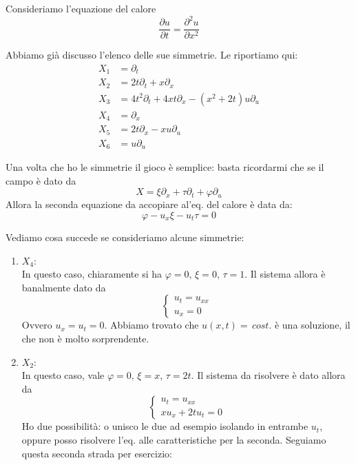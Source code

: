 \documentclass{report}
\begin{document}
\begin{example}
    Consideriamo l'equazione del calore 
    \begin{equation}
        \frac{\partial u}{\partial t} = \frac{\partial^2 u}{\partial x^2}
    \end{equation}

    Abbiamo già discusso l'elenco delle sue simmetrie. Le riportiamo qui: 
    \begin{align}
    X_1 &= \partial_t \\
    X_2 &= 2t\partial_t + x\partial_x \\
    X_3 &= 4t^2\partial_t + 4xt\partial_x - (x^2 + 2t)u\partial_u \\
    X_4 &= \partial_x \\
    X_5 &= 2t\partial_x - xu\partial_u \\
    X_6 &= u\partial_u
\end{align}

Una volta che ho le simmetrie il gioco è semplice: basta ricordarmi che se il campo è dato da 
\begin{equation}
    X = \xi\partial_x + \tau\partial_t + \varphi\partial_u
\end{equation}
Allora la seconda equazione da accopiare al'eq. del calore è data da: 
\begin{equation}
    \varphi - u_x\xi - u_t\tau = 0 
\end{equation}

Vediamo cosa succede se consideriamo alcune simmetrie: 
\begin{enumerate}
    \item $X_4$: \\
    In questo caso, chiaramente si ha $\varphi=0, \, \xi = 0, \, \tau = 1$. Il sistema allora è banalmente dato da 
    \[\begin{cases}
        u_t = u_{xx} \\ u_x = 0 
    \end{cases}\]
    Ovvero $u_x = u_t = 0$. Abbiamo trovato che $u(x,t ) = \, cost.$ è una soluzione, il che non è molto sorprendente. 
    \item $X_2$: \\
    In questo caso, vale $\varphi = 0, \, \xi = x, \, \tau = 2t$. Il sistema da risolvere è dato allora da
    \[\begin{cases}
        u_t = u_{xx} \\
        xu_x + 2tu_t = 0
    \end{cases}\]
    Ho due possibilità: o unisco le due ad esempio isolando in entrambe $u_t$, oppure posso risolvere l'eq. alle caratteristiche per la seconda. Seguiamo questa seconda strada per esercizio: \\


\end{enumerate}
\end{example}
\end{document}

